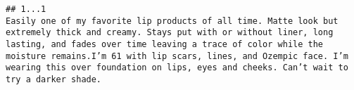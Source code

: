 \documentclass[
  11pt,
]{article}
\begin{document}
\begin{verbatim}
## 1...1                                                                                                                                                                                                                                                                                                                                                                                                                                                                                                                                                                                                                                                                                                                                                                                                                                                                                                                                                                                                                                                                                                                                                                                                                                                                                                                                                                                                                                                                                                                                                                                                                                                            Easily one of my favorite lip products of all time. Matte look but extremely thick and creamy. Stays put with or without liner, long lasting, and fades over time leaving a trace of color while the moisture remains.I’m 61 with lip scars, lines, and Ozempic face. I’m wearing this over foundation on lips, eyes and cheeks. Can’t wait to try a darker shade.

\end{verbatim}
\end{document}

